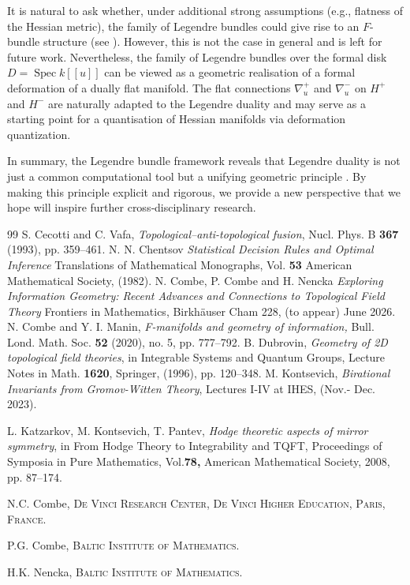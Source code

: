 \documentclass[12pt]{amsart}
\newcommand{\Addresses}{{%
  \bigskip
  \footnotesize

 N.C. Combe, \textsc{De Vinci Research Center, De Vinci Higher Education, Paris, France.}
  

  \medskip

P.G. Combe, \textsc{Baltic Institute of Mathematics.}
 
  \medskip

H.K. Nencka, \textsc{Baltic Institute of Mathematics.}
 

}}
\begin{document}
It is natural to ask whether, under additional strong assumptions (e.g., flatness of the Hessian metric), the family of Legendre bundles could give rise to an $F$-bundle structure (see \cite{K,KKP}). However, this is not the case in general and is left for future work. Nevertheless, the family of Legendre bundles over the formal disk $D = \operatorname{Spec} k[[u]]$ can be viewed as a geometric realisation of a formal deformation of a dually flat manifold. The flat connections $\nabla^+_u$ and $\nabla^-_u$ on $H^+$ and $H^-$ are naturally adapted to the Legendre duality and may serve as a starting point for a quantisation of Hessian manifolds via deformation quantization.

In summary, the Legendre bundle framework reveals that Legendre duality is not just a common computational tool but a unifying geometric principle  . By making this principle explicit and rigorous, we provide a new perspective that we hope will inspire further cross‑disciplinary research.



\begin{thebibliography}{99}
 S. Cecotti and C. Vafa, {\sl Topological–anti-topological fusion}, Nucl. Phys. B {\bf 367} (1993), pp. 359–461.
 N. N. Chentsov {\sl Statistical Decision Rules and Optimal Inference} Translations of Mathematical Monographs, Vol. {\bf 53}
American Mathematical Society, (1982). 
 N. Combe, P. Combe and H. Nencka {\sl Exploring Information Geometry: Recent Advances and Connections to Topological Field Theory}  Frontiers in Mathematics, Birkhäuser Cham 228, (to appear) June 2026.
 N. Combe and Y. I. Manin, {\sl F-manifolds and geometry of information,}
Bull. Lond. Math. Soc. {\bf 52} (2020), no. 5, pp. 777–792.
 B. Dubrovin, {\sl Geometry of 2D topological field theories}, in Integrable Systems and Quantum Groups, Lecture Notes in Math. {\bf 1620}, Springer, (1996), pp. 120–348.
 M. Kontsevich, {\sl  Birational Invariants from Gromov-Witten Theory}, Lectures I-IV at IHES, (Nov.- Dec. 2023).

  L. Katzarkov, M. Kontsevich, T. Pantev,
{\sl Hodge theoretic aspects of mirror symmetry},
in From Hodge Theory to Integrability and TQFT,
Proceedings of Symposia in Pure Mathematics, Vol.{\bf  78,}
American Mathematical Society, 2008, pp. 87–174.
\end{thebibliography}

\Addresses
\end{document}
